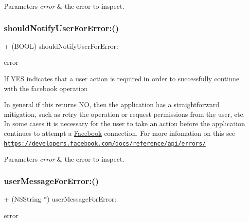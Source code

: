 \begin{DoxyParams}{Parameters}
{\em error} & the error to inspect. \\
\hline
\end{DoxyParams}
\mbox{\label{interfaceFBErrorUtility_a1417132074a898433aa3a79ab6ebc7b6}} 
\subsubsection{\texorpdfstring{should\+Notify\+User\+For\+Error\+:()}{shouldNotifyUserForError:()}\hspace{0.1cm}{\footnotesize\ttfamily [5/5]}}
{\footnotesize\ttfamily + (B\+O\+OL) should\+Notify\+User\+For\+Error\+: \begin{DoxyParamCaption}\item[{(N\+S\+Error $\ast$)}]{error }\end{DoxyParamCaption}}

If Y\+ES indicates that a user action is required in order to successfully continue with the facebook operation

In general if this returns NO, then the application has a straightforward mitigation, such as retry the operation or request permissions from the user, etc. In some cases it is necessary for the user to take an action before the application continues to attempt a \hyperlink{interfaceFacebook}{Facebook} connection. For more infomation on this see \href{https://developers.facebook.com/docs/reference/api/errors/}{\tt https\+://developers.\+facebook.\+com/docs/reference/api/errors/}


\begin{DoxyParams}{Parameters}
{\em error} & the error to inspect. \\
\hline
\end{DoxyParams}
\mbox{\label{interfaceFBErrorUtility_a059cc6fc35dd8fd3a13ee584ca7bb391}} 
\subsubsection{\texorpdfstring{user\+Message\+For\+Error\+:()}{userMessageForError:()}\hspace{0.1cm}{\footnotesize\ttfamily [1/5]}}
{\footnotesize\ttfamily + (N\+S\+String $\ast$) user\+Message\+For\+Error\+: \begin{DoxyParamCaption}\item[{(N\+S\+Error $\ast$)}]{error }\end{DoxyParamCaption}}

